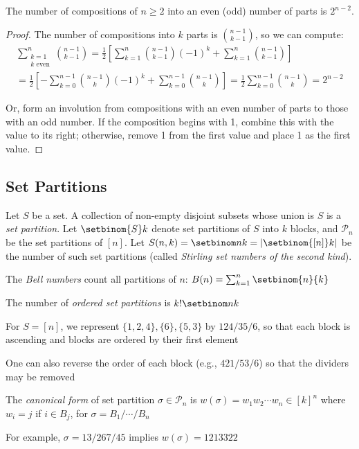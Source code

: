\documentclass[a4paper]{article}
\begin{document}
\begin{theorem}
The number of compositions of $n\geq2$ into an even (odd) number of parts is $2^{n-2}$.

\begin{hl}
\begin{proof}
The number of compositions into $k$ parts is $\binom{n-1}{k-1}$, so we can compute:
\begin{multline*}
\sum_{\substack{k=1\\k\text{ even}}}^n\binom{n-1}{k-1}
=\frac12\left[\sum_{k=1}^n\binom{n-1}{k-1}(-1)^k+\sum_{k=1}^n\binom{n-1}{k-1}\right]\\
=\frac12\left[-\sum_{k=0}^{n-1}\binom{n-1}{k}(-1)^k+\sum_{k=0}^{n-1}\binom{n-1}{k}\right]
=\frac12\sum_{k=0}^{n-1}\binom{n-1}k=2^{n-2}
\end{multline*}

Or, form an involution from compositions with an even number of parts to those with an odd number. If the composition begins with 1, combine this with the value to its right; otherwise, remove 1 from the first value and place 1 as the first value.
\end{proof}
\end{hl}
\end{theorem}

\subsection{Set Partitions}

\begin{definition}
Let $S$ be a set. A collection of non-empty disjoint subsets whose union is $S$ is a \emph{set partition}. Let $\setbinom{S}k$ denote set partitions of $S$ into $k$ blocks, and $\mathcal P_n$ be the set partitions of $[n]$. Let $S(n,k)=\setbinom nk=\left|\setbinom{[n]}k\right|$ be the number of such set partitions (called \emph{Stirling set numbers of the second kind}).
\begin{arrows}
\item The \emph{Bell numbers} count all partitions of $n$: $B(n)=\sum_{k=1}^n\setbinom{n}{k}$
\item The number of \emph{ordered set partitions} is $k!\setbinom nk$
\item For $S=[n]$, we represent $\{1,2,4\},\{6\},\{5,3\}$ by $124/35/6$, so that each block is ascending and blocks are ordered by their first element
\item One can also reverse the order of each block (e.g., $421/53/6$) so that the dividers may be removed
\item The \emph{canonical form} of set partition $\sigma\in\mathcal P_n$ is $w(\sigma)=w_1w_2\cdots w_n\in[k]^n$ where $w_i=j$ if $i\in B_j$, for $\sigma=B_1/\cdots/B_n$
\item For example, $\sigma=13/267/45$ implies $w(\sigma)=1213322$
\end{arrows}
\end{definition}
\end{document}
